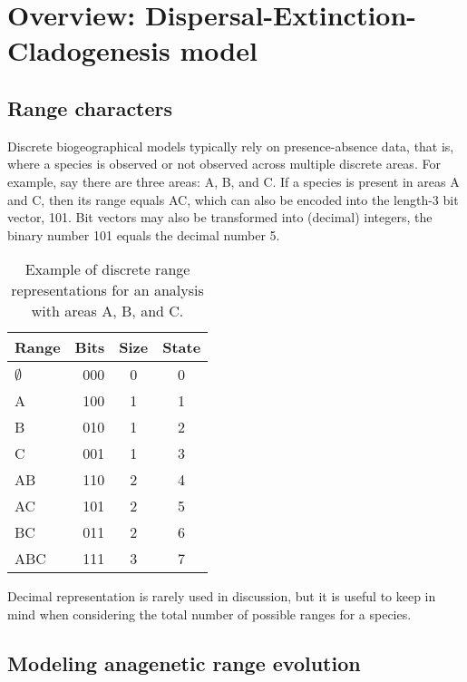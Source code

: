 \section{Overview: Dispersal-Extinction-Cladogenesis model}

\subsection{Range characters}

Discrete biogeographical models typically rely on presence-absence data, that is, where a species is observed or not observed across multiple discrete areas.
For example, say there are three areas: A, B, and C.
If a species is present in areas A and C, then its range equals AC, which can also be encoded into the length-3 bit vector, 101.
Bit vectors may also be transformed into (decimal) integers, \EG the binary number 101 equals the decimal number 5.

\begin{table}[!ht]
\centering
\begin{tabular}{lrcc}
Range & Bits & Size & State \\ \hline
$\emptyset$ & 000 & 0 & 0 \\
          A & 100 & 1 & 1 \\
          B & 010 & 1 & 2 \\
          C & 001 & 1 & 3 \\
         AB & 110 & 2 & 4 \\
         AC & 101 & 2 & 5 \\
         BC & 011 & 2 & 6 \\
        ABC & 111 & 3 & 7 \\
\end{tabular}
\caption{Example of discrete range representations for an analysis with areas A, B, and C.}
\end{table}

Decimal representation is rarely used in discussion, but it is useful to keep in mind when considering the total number of possible ranges for a species.

\subsection{Modeling anagenetic range evolution}

